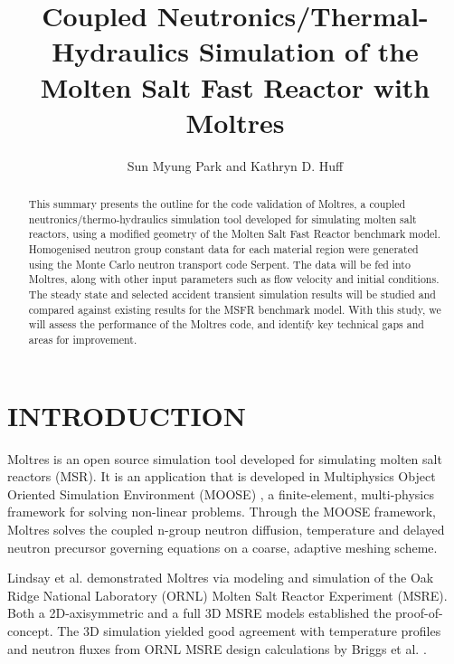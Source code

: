 \documentclass{anstrans}
\title{Coupled Neutronics/Thermal-Hydraulics Simulation of the Molten Salt Fast Reactor with Moltres}
\author{Sun Myung Park and Kathryn D. Huff}
\institute{Dept. of Nuclear, Plasma and Radiological Engineering, University of Illinois at Urbana-Champaign \\
smpark3@illinois.edu}
\begin{document}
\begin{abstract}
This summary presents the outline for the code validation of Moltres, a coupled neutronics/thermo-hydraulics simulation tool developed for simulating molten salt reactors, using a modified geometry of the Molten Salt Fast Reactor benchmark model. Homogenised neutron group constant data for each material region were generated using the Monte Carlo neutron transport code Serpent. The data will be fed into Moltres, along with other input parameters such as flow velocity and initial conditions. The steady state and selected accident transient simulation results will be studied and compared against existing results for the MSFR benchmark model. With this study, we will assess the performance of the Moltres code, and identify key technical gaps and areas for improvement.
\end{abstract}

\section{INTRODUCTION}

Moltres is an open source simulation tool developed for simulating molten salt reactors (MSR). It is an application that is developed in Multiphysics Object Oriented Simulation Environment (MOOSE) \cite{gaston_moose:_2009}, a finite-element, multi-physics framework for solving non-linear problems. Through the MOOSE framework, Moltres solves the coupled n-group neutron diffusion, temperature and delayed neutron precursor governing equations on a coarse, adaptive meshing scheme. 

Lindsay et al. \cite{lindsay_introduction_2018} demonstrated Moltres via modeling and simulation of the Oak Ridge National Laboratory (ORNL) Molten Salt Reactor Experiment (MSRE). Both a 2D-axisymmetric and a full 3D MSRE models established the proof-of-concept. The 3D simulation yielded good agreement with temperature profiles and neutron fluxes from ORNL MSRE design calculations by Briggs et al. \cite{briggs_molten-salt_1964}.

\end{document}
